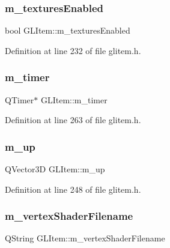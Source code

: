 \subsubsection{\texorpdfstring{m\_texturesEnabled}{m\_texturesEnabled}}
{\footnotesize\ttfamily bool G\+L\+Item\+::m\+\_\+textures\+Enabled\hspace{0.3cm}{\ttfamily [protected]}}



Definition at line 232 of file glitem.\+h.

\mbox{\label{class_g_l_item_a6c60908bebbb5d5089f363b425d9a744}} 
\subsubsection{\texorpdfstring{m\_timer}{m\_timer}}
{\footnotesize\ttfamily Q\+Timer$\ast$ G\+L\+Item\+::m\+\_\+timer\hspace{0.3cm}{\ttfamily [protected]}}



Definition at line 263 of file glitem.\+h.

\mbox{\label{class_g_l_item_abeb358b4ad8161c9837e875fe19da5ee}} 
\subsubsection{\texorpdfstring{m\_up}{m\_up}}
{\footnotesize\ttfamily Q\+Vector3D G\+L\+Item\+::m\+\_\+up\hspace{0.3cm}{\ttfamily [protected]}}



Definition at line 248 of file glitem.\+h.

\mbox{\label{class_g_l_item_a669c6b22f83bc2d6739e80a8870eab57}} 
\subsubsection{\texorpdfstring{m\_vertexShaderFilename}{m\_vertexShaderFilename}}
{\footnotesize\ttfamily Q\+String G\+L\+Item\+::m\+\_\+vertex\+Shader\+Filename\hspace{0.3cm}{\ttfamily [protected]}}



